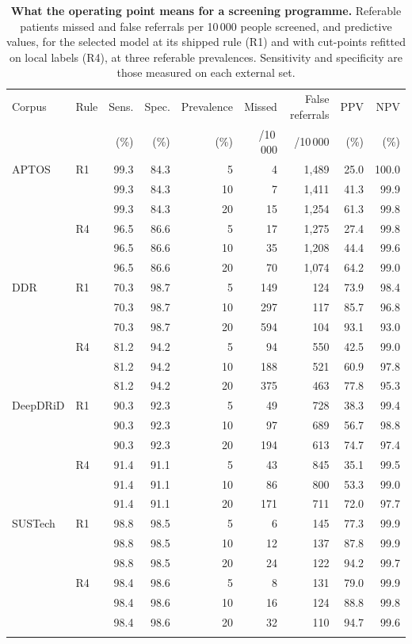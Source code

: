 \begin{table}[h]
\caption{\textbf{What the operating point means for a screening programme.} Referable patients missed and false referrals per 10\,000 people screened, and predictive values, for the selected model at its shipped rule (R1) and with cut-points refitted on local labels (R4), at three referable prevalences. Sensitivity and specificity are those measured on each external set.}\label{tab:clinical}
\centering\scriptsize
\begin{tabular}{@{}llrrrrrrr@{}}
\toprule
Corpus & Rule & Sens. & Spec. & Prevalence & Missed & False referrals & PPV & NPV \\
 & & (\%) & (\%) & (\%) & /10\,000 & /10\,000 & (\%) & (\%) \\
\midrule
APTOS & R1 & 99.3 & 84.3 & 5 & 4 & 1,489 & 25.0 & 100.0 \\
 &  & 99.3 & 84.3 & 10 & 7 & 1,411 & 41.3 & 99.9 \\
 &  & 99.3 & 84.3 & 20 & 15 & 1,254 & 61.3 & 99.8 \\
 & R4 & 96.5 & 86.6 & 5 & 17 & 1,275 & 27.4 & 99.8 \\
 &  & 96.5 & 86.6 & 10 & 35 & 1,208 & 44.4 & 99.6 \\
 &  & 96.5 & 86.6 & 20 & 70 & 1,074 & 64.2 & 99.0 \\
\addlinespace
DDR & R1 & 70.3 & 98.7 & 5 & 149 & 124 & 73.9 & 98.4 \\
 &  & 70.3 & 98.7 & 10 & 297 & 117 & 85.7 & 96.8 \\
 &  & 70.3 & 98.7 & 20 & 594 & 104 & 93.1 & 93.0 \\
 & R4 & 81.2 & 94.2 & 5 & 94 & 550 & 42.5 & 99.0 \\
 &  & 81.2 & 94.2 & 10 & 188 & 521 & 60.9 & 97.8 \\
 &  & 81.2 & 94.2 & 20 & 375 & 463 & 77.8 & 95.3 \\
\addlinespace
DeepDRiD & R1 & 90.3 & 92.3 & 5 & 49 & 728 & 38.3 & 99.4 \\
 &  & 90.3 & 92.3 & 10 & 97 & 689 & 56.7 & 98.8 \\
 &  & 90.3 & 92.3 & 20 & 194 & 613 & 74.7 & 97.4 \\
 & R4 & 91.4 & 91.1 & 5 & 43 & 845 & 35.1 & 99.5 \\
 &  & 91.4 & 91.1 & 10 & 86 & 800 & 53.3 & 99.0 \\
 &  & 91.4 & 91.1 & 20 & 171 & 711 & 72.0 & 97.7 \\
\addlinespace
SUSTech & R1 & 98.8 & 98.5 & 5 & 6 & 145 & 77.3 & 99.9 \\
 &  & 98.8 & 98.5 & 10 & 12 & 137 & 87.8 & 99.9 \\
 &  & 98.8 & 98.5 & 20 & 24 & 122 & 94.2 & 99.7 \\
 & R4 & 98.4 & 98.6 & 5 & 8 & 131 & 79.0 & 99.9 \\
 &  & 98.4 & 98.6 & 10 & 16 & 124 & 88.8 & 99.8 \\
 &  & 98.4 & 98.6 & 20 & 32 & 110 & 94.7 & 99.6 \\
\addlinespace
\bottomrule
\end{tabular}
\end{table}
